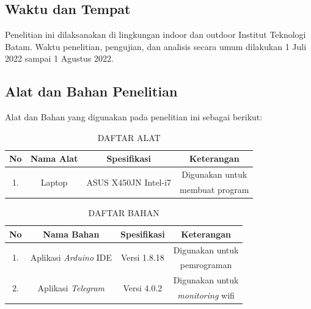 \documentclass[conference]{IEEEtran}
\begin{document}
\subsection{Waktu dan Tempat}
Penelitian ini dilaksanakan di lingkungan indoor dan outdoor Institut
Teknologi Batam. Waktu penelitian, pengujian, dan analisis secara umum
dilakukan 1 Juli 2022 sampai 1 Agustus 2022.

\subsection{Alat dan Bahan Penelitian}
Alat dan Bahan yang digunakan pada penelitian ini sebagai berikut:
\begin{table}[htbp]
        \caption{DAFTAR ALAT}
        \label{tab3}
        \centering
        \begin{tabular}{|c|c|c|c|}
        \hline
        \textbf{No} & \textbf{Nama Alat} & \textbf{Spesifikasi}& \textbf{Keterangan} \\
        \hline
        \multirow{2}{*}{1.} & \multirow{2}{*}{Laptop} & \multirow{2}{*}{ASUS X450JN Intel-i7} & Digunakan untuk \\ 
        & & & membuat program \\
        \hline
        \end{tabular}
\end{table}

\begin{table}[htbp]
        \caption{DAFTAR BAHAN}
        \label{tab4}
        \centering
        \begin{tabular}{|c|c|c|c|}
        \hline
        \textbf{No} & \textbf{Nama Bahan} & \textbf{Spesifikasi}& \textbf{Keterangan} \\
        \hline
        \multirow{2}{*}{1.} & \multirow{2}{*}{Aplikasi \textit{Arduino} IDE} & \multirow{2}{*}{Versi 1.8.18} & Digunakan untuk \\ 
        & & & pemrograman \\
        \hline
         \multirow{2}{*}{2.} & \multirow{2}{*}{Aplikasi \textit{Telegram}} & \multirow{2}{*}{Versi 4.0.2} & Digunakan untuk \\ 
        & & & \textit{monitoring} wifi \\
        \hline
        \end{tabular}
\end{table}  
   
\end{document}
